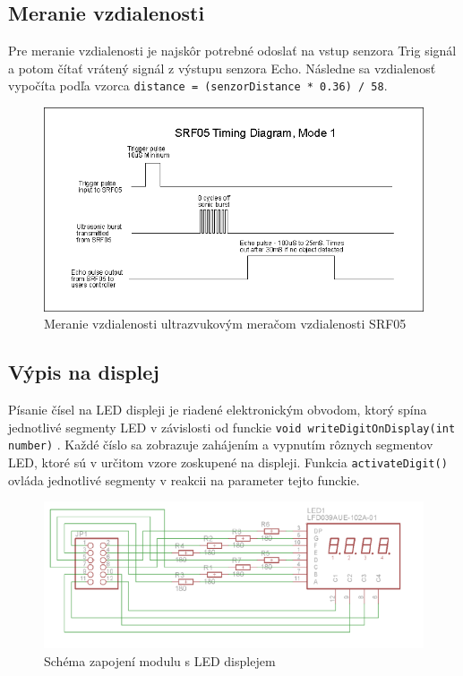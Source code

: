 \documentclass[a4paper, 11pt]{article}
\begin{document}
    \subsection{Meranie vzdialenosti}
    Pre meranie vzdialenosti je najskôr potrebné odoslať na vstup senzora Trig signál a potom čítať vrátený signál z výstupu senzora Echo.
    Následne sa vzdialenosť vypočíta podľa vzorca \texttt{distance = (senzorDistance * 0.36) / 58}.\cite{SRF05}

    \begin{figure}[!ht]
		\centering
		\vspace{1cm}
		\includegraphics[width=0.95\linewidth]{resources/sensor_srf05.png}
		\caption{Meranie vzdialenosti ultrazvukovým meračom vzdialenosti SRF05\cite{SRF05}}
		\label{figure:finalStateMachine}
	\end{figure}

    \subsection{Výpis na displej}
    Písanie čísel na LED displeji je riadené elektronickým obvodom, ktorý spína jednotlivé segmenty LED v závislosti od funckie \texttt{void writeDigitOnDisplay(int number)} .
    Každé číslo sa zobrazuje zahájením a vypnutím rôznych segmentov LED, ktoré sú v určitom vzore zoskupené na displeji. Funkcia
    \texttt{activateDigit()} ovláda jednotlivé segmenty v reakcii na parameter tejto funckie.

    \begin{figure}[!ht]
		\centering
		\vspace{1cm}
		\includegraphics[width=0.95\linewidth]{resources/displej_schema_zapojenia.png}
		\caption{Schéma zapojení modulu s LED displejem\cite[snímka 4]{PresentationForProject}}
		\label{figure:finalStateMachine}
	\end{figure}
\end{document}
